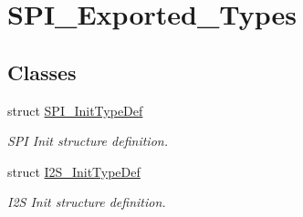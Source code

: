 \hypertarget{group__SPI__Exported__Types}{
\section{SPI\_\-Exported\_\-Types}
\label{group__SPI__Exported__Types}
}
\subsection*{Classes}
\begin{DoxyCompactItemize}
\item 
struct \hyperlink{structSPI__InitTypeDef}{SPI\_\-InitTypeDef}
\begin{DoxyCompactList}\small\item\em SPI Init structure definition. \item\end{DoxyCompactList}\item 
struct \hyperlink{structI2S__InitTypeDef}{I2S\_\-InitTypeDef}
\begin{DoxyCompactList}\small\item\em I2S Init structure definition. \item\end{DoxyCompactList}\end{DoxyCompactItemize}
